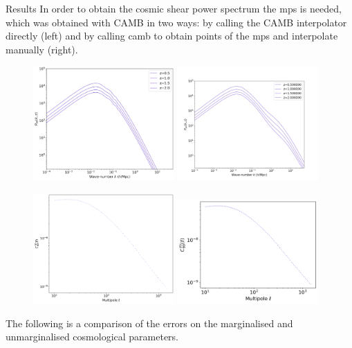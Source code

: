 \begin{frame}[t]
\begin{columns}[t]
\begin{column}{.465\textwidth}
\begin{block}{Results}
In order to obtain the cosmic shear power spectrum the mps is needed, which was obtained with CAMB \cite{p3} in two ways: by calling the CAMB interpolator directly (left) and by calling camb to obtain points of the mps and interpolate manually (right).
\begin{figure}
    \centering
    \includegraphics[width=0.48\textwidth]{fig_results/mps.png}
    \includegraphics[width=0.48\textwidth]{fig_results/MPS.png}
    \label{mps}
\end{figure}

\begin{figure}
    \centering
    \includegraphics[width=0.48\textwidth]{fig_results/cosmicshear_ps.png}
    \includegraphics[width=0.48\textwidth]{fig_results/cosmicshear_ps_connie.png}
    \label{mps}
\end{figure}
The following is a comparison of the errors on the marginalised and unmarginalised cosmological parameters.


\end{block}
\end{column}
\end{columns}
\end{frame}
